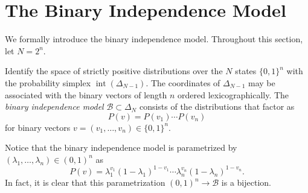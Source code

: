 \documentclass[cclicense]{hmcthesis}
\newcommand*{\Bin}{\mathcal{B}}
\DeclareMathOperator{\intr}{int}
\numberwithin{equation}{section}
\begin{document}
\section{The Binary Independence Model}

    We formally introduce the binary independence model.  Throughout this
    section, let $N = 2^n$.
    \begin{definition}
    Identify the space of strictly positive distributions over the $N$ states
    $\{0,1\}^n$ with the probability simplex $\intr(\Delta_{N-1})$.  The
    coordinates of $\Delta_{N-1}$ may be associated with the binary vectors of
    length $n$ ordered lexicographically.  The \emph{binary independence model}
    $\Bin \subset \Delta_N$ consists of the distributions that factor as
    \[
        P(v) = P(v_1) \cdots P(v_n)
    \]
    for binary vectors $v = (v_1, \ldots, v_n) \in \{0,1\}^n$.
    \end{definition}

    Notice that the binary independence model is parametrized by $(\lambda_1,
    \ldots, \lambda_n) \in (0,1)^n$ as
    \begin{equation} \label{eq:bin}
        P(v) 
        = \lambda_1^{v_1}(1 - \lambda_1)^{1 - v_1}
        \cdots \lambda_n^{v_n}(1 - \lambda_n)^{1 - v_n}.
    \end{equation}
    In fact, it is clear that this parametrization $(0,1)^n \to \Bin$ is a
    bijection.
\end{document}
